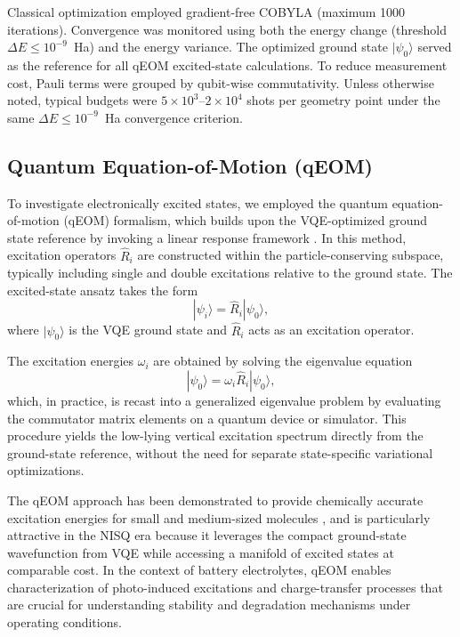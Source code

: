 \documentclass[num-refs]{wiley-article}
\begin{document}
Classical optimization employed gradient-free COBYLA\cite{powell1994direct} (maximum 1000 iterations). 
Convergence was monitored using both the energy change (threshold $\Delta E \le 10^{-9}$~Ha) and the energy variance. 
The optimized ground state $|\psi_0\rangle$ served as the reference for all qEOM excited-state calculations. To reduce measurement cost, Pauli terms were grouped by qubit-wise commutativity. 
Unless otherwise noted, typical budgets were $5{\times}10^3$--$2{\times}10^4$ shots per geometry point under the same $\Delta E \le 10^{-9}$~Ha convergence criterion.


\subsection{Quantum Equation-of-Motion (qEOM)}

To investigate electronically excited states, we employed the quantum equation-of-motion (qEOM) formalism, which builds upon the VQE-optimized ground state reference by invoking a linear response framework \cite{ollitrault2020quantum,santagati2018witnessing,higgott2019variational,mcclean2017hybrid,colless2018computation}. In this method, excitation operators $\hat{R}_i$ are constructed within the particle-conserving subspace, typically including single and double excitations relative to the ground state. The excited-state ansatz takes the form
\begin{equation}
|\psi_i\rangle = \hat{R}_i |\psi_0\rangle ,
\end{equation}
where $|\psi_0\rangle$ is the VQE ground state and $\hat{R}_i$ acts as an excitation operator.  

The excitation energies $\omega_i$ are obtained by solving the eigenvalue equation
\begin{equation}
[\hat{H}, \hat{R}_i] |\psi_0\rangle = \omega_i \hat{R}_i |\psi_0\rangle ,
\end{equation}
which, in practice, is recast into a generalized eigenvalue problem by evaluating the commutator matrix elements on a quantum device or simulator. This procedure yields the low-lying vertical excitation spectrum directly from the ground-state reference, without the need for separate state-specific variational optimizations.  

The qEOM approach has been demonstrated to provide chemically accurate excitation energies for small and medium-sized molecules \cite{mcardle2020quantum,fan2021equation}, and is particularly attractive in the NISQ era because it leverages the compact ground-state wavefunction from VQE while accessing a manifold of excited states at comparable cost. In the context of battery electrolytes, qEOM enables characterization of photo-induced excitations and charge-transfer processes that are crucial for understanding stability and degradation mechanisms under operating conditions.
\end{document}

